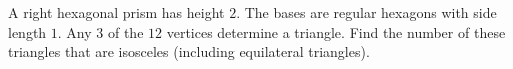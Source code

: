 A right hexagonal prism has height $2$. The bases are regular hexagons with side length $1$. Any $3$ of the $12$ vertices determine a triangle. Find the number of these triangles that are isosceles (including equilateral triangles).